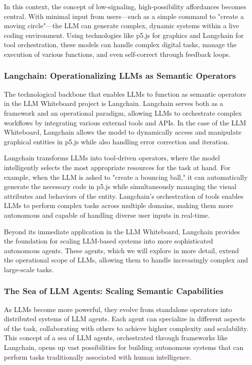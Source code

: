 In this context, the concept of low-signaling, high-possibility affordances becomes central.
With minimal input from users—such as a simple command to "create a moving circle"—the LLM can generate complex, dynamic systems within a live coding environment.
Using technologies like p5.js for graphics and Langchain for tool orchestration, these models can handle complex digital tasks, manage the execution of various functions, and even self-correct through feedback loops.

\subsubsection{Langchain: Operationalizing LLMs as Semantic Operators}
The technological backbone that enables LLMs to function as semantic operators in the LLM Whiteboard project is Langchain.
Langchain serves both as a framework and an operational paradigm, allowing LLMs to orchestrate complex workflows by integrating various external tools and APIs.
In the case of the LLM Whiteboard, Langchain allows the model to dynamically access and manipulate graphical entities in p5.js while also handling error correction and iteration.

Langchain transforms LLMs into tool-driven operators, where the model intelligently selects the most appropriate resources for the task at hand.
For example, when the LLM is asked to "create a bouncing ball," it can automatically generate the necessary code in p5.js while simultaneously managing the visual attributes and behaviors of the entity.
Langchain’s orchestration of tools enables LLMs to perform complex tasks across multiple domains, making them more autonomous and capable of handling diverse user inputs in real-time.

Beyond its immediate application in the LLM Whiteboard, Langchain provides the foundation for scaling LLM-based systems into more sophisticated autonomous agents.
These agents, which we will explore in more detail, extend the operational scope of LLMs, allowing them to handle increasingly complex and large-scale tasks.

\subsubsection{The Sea of LLM Agents: Scaling Semantic Capabilities}
As LLMs become more powerful, they evolve from standalone operators into distributed systems of LLM agents.
Each agent can specialize in different aspects of the task, collaborating with others to achieve higher complexity and scalability.
This concept of a sea of LLM agents, orchestrated through frameworks like Langchain, opens up vast possibilities for building autonomous systems that can perform tasks traditionally associated with human intelligence.

